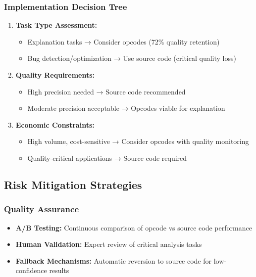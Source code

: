 \documentclass[11pt,a4paper]{article}
\begin{document}
\subsubsection{Implementation Decision Tree}
\begin{enumerate}
    \item \textbf{Task Type Assessment:}
    \begin{itemize}
        \item Explanation tasks → Consider opcodes (72\% quality retention)
        \item Bug detection/optimization → Use source code (critical quality loss)
    \end{itemize}
    
    \item \textbf{Quality Requirements:}
    \begin{itemize}
        \item High precision needed → Source code recommended
        \item Moderate precision acceptable → Opcodes viable for explanation
    \end{itemize}
    
    \item \textbf{Economic Constraints:}
    \begin{itemize}
        \item High volume, cost-sensitive → Consider opcodes with quality monitoring
        \item Quality-critical applications → Source code required
    \end{itemize}
\end{enumerate}

\subsection{Risk Mitigation Strategies}

\subsubsection{Quality Assurance}
\begin{itemize}
    \item \textbf{A/B Testing:} Continuous comparison of opcode vs source code performance
    \item \textbf{Human Validation:} Expert review of critical analysis tasks
    \item \textbf{Fallback Mechanisms:} Automatic reversion to source code for low-confidence results
\end{itemize}
\end{document}
